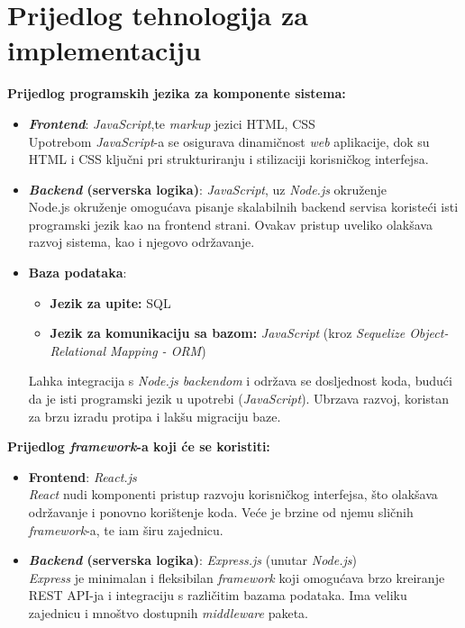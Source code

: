 \section{Prijedlog tehnologija za implementaciju}


\textbf{Prijedlog programskih jezika za komponente sistema:}
\begin{itemize}  
    \item \textbf{\textit{Frontend}}: \textit{JavaScript},te \textit{markup} jezici HTML, CSS\\ 
    Upotrebom \textit{JavaScript}-a se osigurava dinamičnost \textit{web} aplikacije, dok su HTML i CSS ključni pri strukturiranju i stilizaciji korisničkog interfejsa.
    \item \textbf{\textit{Backend} (serverska logika)}:  \textit{JavaScript}, uz\textit{ Node.js} okruženje\\
    Node.js okruženje omogućava pisanje skalabilnih backend servisa koristeći isti programski jezik kao na frontend strani. Ovakav pristup uveliko olakšava razvoj sistema, kao i njegovo održavanje. 
    \item \textbf{Baza podataka}: \begin{itemize}
        \item \textbf{Jezik za upite:} SQL
        \item \textbf{Jezik za komunikaciju sa bazom:} \textit{JavaScript} (kroz \textit{Sequelize Object-Relational Mapping - ORM})
    \end{itemize}
    Lahka integracija s \textit{Node.js backendom} i održava se dosljednost koda, budući da je isti programski jezik u upotrebi (\textit{JavaScript}). Ubrzava razvoj, koristan za brzu izradu protipa i lakšu migraciju baze.
\end{itemize} 
\textbf{Prijedlog \textit{framework}-a koji će se koristiti:}
\begin{itemize}  
    \item \textbf{Frontend}: \textit{React.js}\\
    \textit{React} nudi komponenti pristup razvoju korisničkog interfejsa, što olakšava održavanje i ponovno korištenje koda. Veće je brzine od njemu sličnih \textit{framework}-a, te iam širu zajednicu.
    \item \textbf{\textit{Backend} (serverska logika)}: \textit{Express.js} (unutar \textit{Node.js})\\
    \textit{Express} je minimalan i fleksibilan \textit{framework} koji omogućava brzo kreiranje REST API-ja i integraciju s različitim bazama podataka. Ima veliku zajednicu i mnoštvo dostupnih \textit{middleware} paketa.
\end{itemize} 
